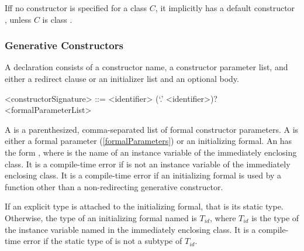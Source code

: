 \documentclass[makeidx]{article}
\begin{document}



\LMHash{}%
If{}f no constructor is specified for a class $C$, it implicitly has a default constructor , unless $C$ is class .


\subsubsection{Generative Constructors}

\LMHash{}%
A 
declaration consists of a constructor name, a constructor parameter list,
and either a redirect clause or an initializer list and an optional body.

\begin{grammar}
<constructorSignature> ::= \gnewline{}
  <identifier> (`.' <identifier>)? <formalParameterList>
\end{grammar}

\LMHash{}%
A  is a parenthesized, comma-separated list of formal constructor parameters.
A  is either a formal parameter (\ref{formalParameters}) or an initializing formal.
An  has the form , where \id{} is the name of an instance variable of the immediately enclosing class.
It is a compile-time error if \id{} is not an instance variable of the immediately enclosing class.
It is a compile-time error if an initializing formal is used by a function other than a non-redirecting generative constructor.

\LMHash{}%
If an explicit type is attached to the initializing formal, that is its static type.
Otherwise, the type of an initializing formal named \id{} is $T_{id}$, where $T_{id}$ is the type of the instance variable named \id{} in the immediately enclosing class.
It is a compile-time error if the static type of \id{} is not a subtype of $T_{id}$.
\end{document}
